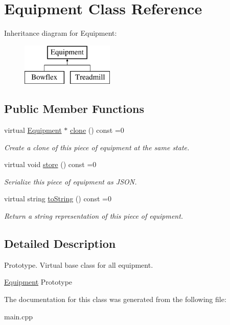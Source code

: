 \hypertarget{class_equipment}{}\section{Equipment Class Reference}
\label{class_equipment}
Inheritance diagram for Equipment\+:\begin{figure}[H]
\begin{center}
\leavevmode
\includegraphics[height=2.000000cm]{class_equipment}
\end{center}
\end{figure}
\subsection*{Public Member Functions}
\begin{DoxyCompactItemize}
\item 
\hypertarget{class_equipment_a5c6929939d117e84e182e21a62a7723a}{}virtual \hyperlink{class_equipment}{Equipment} $\ast$ \hyperlink{class_equipment_a5c6929939d117e84e182e21a62a7723a}{clone} () const  =0\label{class_equipment_a5c6929939d117e84e182e21a62a7723a}

\begin{DoxyCompactList}\small\item\em Create a clone of this piece of equipment at the same state. \end{DoxyCompactList}\item 
\hypertarget{class_equipment_a9db9134f9e60c62d66fd6184ace985c3}{}virtual void \hyperlink{class_equipment_a9db9134f9e60c62d66fd6184ace985c3}{store} () const  =0\label{class_equipment_a9db9134f9e60c62d66fd6184ace985c3}

\begin{DoxyCompactList}\small\item\em Serialize this piece of equipment as J\+S\+O\+N. \end{DoxyCompactList}\item 
\hypertarget{class_equipment_adc1e79be9fcf87bd78e073c5177f89e5}{}virtual string \hyperlink{class_equipment_adc1e79be9fcf87bd78e073c5177f89e5}{to\+String} () const  =0\label{class_equipment_adc1e79be9fcf87bd78e073c5177f89e5}

\begin{DoxyCompactList}\small\item\em Return a string representation of this piece of equipment. \end{DoxyCompactList}\end{DoxyCompactItemize}


\subsection{Detailed Description}
Prototype. Virtual base class for all equipment.

\hyperlink{class_equipment}{Equipment} Prototype 

The documentation for this class was generated from the following file\+:\begin{DoxyCompactItemize}
\item 
main.\+cpp\end{DoxyCompactItemize}
